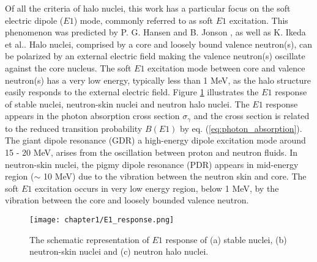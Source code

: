 Of all the criteria of halo nuclei, this work has a particular focus on the soft electric dipole ($E1$) mode, commonly referred to as soft $E1$ excitation. This phenomenon was predicted by P. G. Hansen and B. Jonson \cite{HansenandJonson}, as well as K. Ikeda et al.\cite{Ikeda}. Halo nuclei, comprised by a core and loosely bound valence neutron(s), can be polarized by an external electric field making the valence neutron(s) oscillate against the core nucleus. The soft $E1$ excitation mode between core and valence neutron(s) has a very low energy, typically less than 1 MeV, as the halo structure easily responds to the external electric field. Figure \ref{fig:E1_response} illustrates the $E1$ response of stable nuclei, neutron-skin nuclei and neutron halo nuclei. The $E1$ response appears in the photon absorption cross section $\sigma_\gamma$ and the  cross section is related to the reduced transition probability $B(E1)$ by eq. (\ref{eq:photon_absorption}). The giant dipole resonance (GDR) a high-energy dipole excitation mode around 15 - 20 MeV, arises from the oscillation between proton and neutron fluids. In neutron-skin nuclei, the pigmy dipole resonance (PDR) appears in mid-energy region ($\sim$ 10 MeV) due to the vibration between the neutron skin and core. The soft $E1$ excitation occurs in very low energy region, below 1 MeV, by the vibration between the core and loosely bounded valence neutron.

\begin{figure}
    \centering
    \texttt{[image: chapter1/E1\_response.png]}
    \caption{The schematic representation of $E1$ response of (a) stable nuclei, (b) neutron-skin nuclei and (c) neutron halo nuclei. \cite{Nakamura17}}
    \label{fig:E1_response}
\end{figure}

